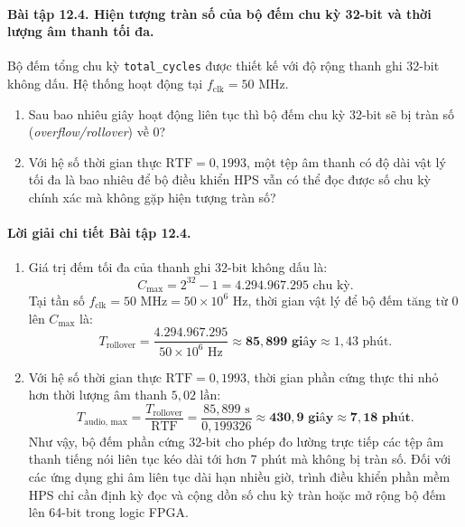 \paragraph{Bài tập 12.4. Hiện tượng tràn số của bộ đếm chu kỳ 32-bit và thời lượng âm thanh tối đa.}
Bộ đếm tổng chu kỳ \texttt{total\_cycles} được thiết kế với độ rộng thanh ghi 32-bit không dấu. Hệ thống hoạt động tại $f_{\text{clk}} = 50\text{ MHz}$.
\begin{enumerate}[label=(\alph*)]
    \item Sau bao nhiêu giây hoạt động liên tục thì bộ đếm chu kỳ 32-bit sẽ bị tràn số (\emph{overflow/rollover}) về $0$?
    \item Với hệ số thời gian thực $\text{RTF} = 0{,}1993$, một tệp âm thanh có độ dài vật lý tối đa là bao nhiêu để bộ điều khiển HPS vẫn có thể đọc được số chu kỳ chính xác mà không gặp hiện tượng tràn số?
\end{enumerate}

\paragraph{Lời giải chi tiết Bài tập 12.4.}
\begin{enumerate}[label=(\alph*)]
    \item Giá trị đếm tối đa của thanh ghi 32-bit không dấu là:
    \begin{equation}
        C_{\max} = 2^{32} - 1 = 4.294.967.295\text{ chu kỳ}.
    \end{equation}
    Tại tần số $f_{\text{clk}} = 50\text{ MHz} = 50 \times 10^6\text{ Hz}$, thời gian vật lý để bộ đếm tăng từ $0$ lên $C_{\max}$ là:
    \begin{equation}
        T_{\text{rollover}} = \frac{4.294.967.295}{50 \times 10^6\text{ Hz}} \approx \mathbf{85{,}899\text{ giây}} \approx 1{,}43\text{ phút}.
    \end{equation}

    \item Với hệ số thời gian thực $\text{RTF} = 0{,}1993$, thời gian phần cứng thực thi nhỏ hơn thời lượng âm thanh $5{,}02\text{ lần}$:
    \begin{equation}
        T_{\text{audio, max}} = \frac{T_{\text{rollover}}}{\text{RTF}} = \frac{85{,}899\text{ s}}{0{,}199326} \approx \mathbf{430{,}9\text{ giây}} \approx \mathbf{7{,}18\text{ phút}}.
    \end{equation}
    Như vậy, bộ đếm phần cứng 32-bit cho phép đo lường trực tiếp các tệp âm thanh tiếng nói liên tục kéo dài tới hơn 7 phút mà không bị tràn số. Đối với các ứng dụng ghi âm liên tục dài hạn nhiều giờ, trình điều khiển phần mềm HPS chỉ cần định kỳ đọc và cộng dồn số chu kỳ tràn hoặc mở rộng bộ đếm lên 64-bit trong logic FPGA.
\end{enumerate}
